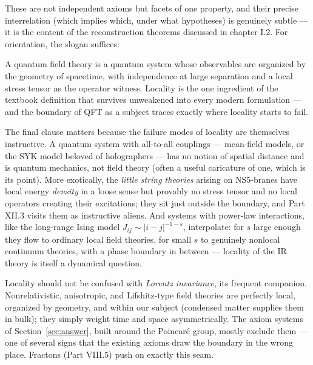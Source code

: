\noin These are not independent axioms but facets of one property, and their
precise interrelation (which implies which, under what hypotheses) is
genuinely subtle --- it is the content of the reconstruction theorems
discussed in chapter I.2. For orientation, the slogan suffices:

\begin{iidea}
\label{idea:locality}
A quantum field theory is a quantum system whose observables are organized by
the geometry of spacetime, with independence at large separation and a local
stress tensor as the operator witness. Locality is the one ingredient of the
textbook definition that survives unweakened into every modern formulation ---
and the boundary of QFT as a subject traces exactly where locality starts to
fail.
\end{iidea}

The final clause matters because the failure modes of locality are themselves
instructive. A
quantum system with all-to-all couplings --- mean-field models, or the SYK model
beloved of holographers --- has no notion of spatial distance and is quantum
mechanics, not field theory (often a useful caricature of one, which is its
point). More exotically, the \emph{little string theories} arising on NS5-branes
have local energy \emph{density} in a loose sense but provably no stress tensor
and no local operators creating their excitations; they sit just outside the
boundary, and Part XII.3 visits them as instructive aliens. And systems with
power-law interactions, like the long-range Ising model $J_{ij} \sim
|i-j|^{-1-s}$, interpolate: for $s$ large enough they flow to ordinary local
field theories, for small $s$ to genuinely nonlocal continuum theories, with a
phase boundary in between --- locality of the IR theory is itself a dynamical
question.

\begin{nnote}
Locality should not be confused with \emph{Lorentz invariance}, its frequent
companion. Nonrelativistic, anisotropic, and Lifshitz-type field theories are
perfectly local, organized by geometry, and within our subject (condensed matter
supplies them in bulk); they simply weight time and space asymmetrically. The
axiom systems of Section~\ref{sec:answer}, built around the Poincar\'e group,
mostly exclude them --- one of several signs that the existing axioms draw the
boundary in the wrong place. Fractons (Part VIII.5) push on exactly this seam.
\end{nnote}

